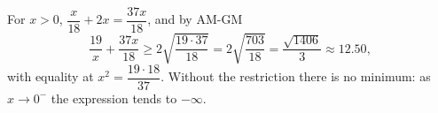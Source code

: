 For $x>0$, $\dfrac {x}{18}+2x=\dfrac{37x}{18}$, and by AM-GM
\[\dfrac{19}{x}+\dfrac{37x}{18}\ge2\sqrt{\dfrac{19\cdot37}{18}}=2\sqrt{\dfrac{703}{18}}=\boxed{\dfrac{\sqrt{1406}}{3}}\approx12.50,\]
with equality at $x^2=\dfrac{19\cdot18}{37}$. Without the restriction there is no minimum: as $x\to0^-$ the expression tends to $-\infty$.
